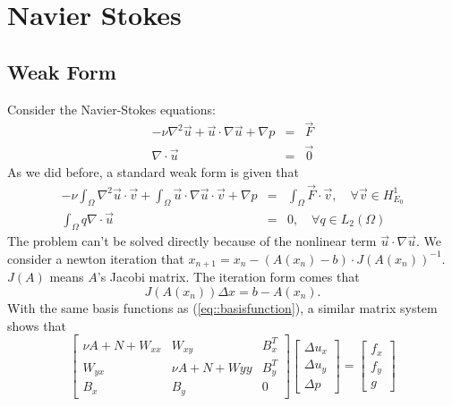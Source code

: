 \documentclass[a4paper]{article}
\begin{document}
\section{Navier Stokes}
\subsection{Weak Form}
Consider the Navier-Stokes equations:
\begin{equation}
\begin{array}{rcl}
-\nu \nabla^2 \vec{u} + \vec{u}\cdot \nabla \vec{u} + \nabla p &=& \vec{F} \\
\nabla \cdot \vec{u} &=& \vec{0}
\label{eq::Navier-Stokes-problem}
\end{array}
\end{equation}
As we did before, a standard weak form is given that
\begin{equation}
\begin{array}{rcl}
-\nu\int_\Omega \nabla^2 \vec{u} \cdot \vec{v}+\int_{\Omega}\vec{u}\cdot\nabla\vec{u}\cdot\vec{v} + \nabla p &=& \int_{\Omega}\vec{F}\cdot \vec{v},\quad \forall \vec{v} \in H^1_{E_0} \\
\int_\Omega q\nabla \cdot \vec{u} &=&0,\quad \forall q \in L_2(\Omega)
\label{eq::Navier-Stokes-weakform}
\end{array}
\end{equation}
The problem can't be solved directly because of the nonlinear term $\vec{u}\cdot \nabla \vec{u}$. We consider a newton iteration that $x_{n+1}=x_{n} - (A(x_n)-b)\cdot J(A(x_{n}))^{-1}$. $J(A)$ means $A$'s Jacobi matrix. The iteration form comes that
$$ J(A(x_n))\Delta x = b - A(x_n).$$
\indent With the same basis functions as (\ref{eq::basisfunction}), a similar matrix system shows that
\begin{equation}
\left[ \begin{array}{ccc}
\nu A + N +W_{xx} & W_{xy} & B_x^T \\
W_{yx} & \nu A +N +W{yy}& B_y^T \\
B_x & B_y & 0
\end{array}
\right]
\left[\begin{array}{ccc}
\Delta u_x\\
\Delta u_y\\
\Delta p
\end{array}
\right]=
\left[\begin{array}{ccc}
f_x\\
f_y\\
g
\end{array}
\right]
\label{Navier-Stokes}
\end{equation}
\end{document}
